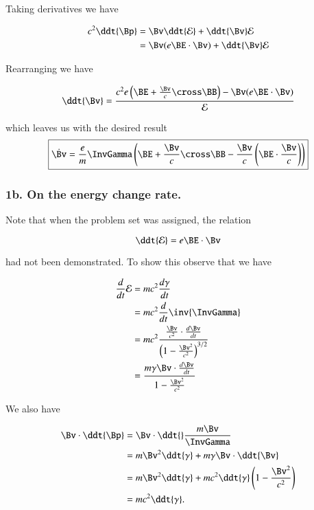 Taking derivatives we have

\begin{align*}
c^2 \ddt{\Bp} 
&= \Bv \ddt{\mathcal{E}} + \ddt{\Bv} \mathcal{E} \\
&= \Bv (e \BE \cdot \Bv) + \ddt{\Bv} \mathcal{E} \\
\end{align*}

Rearranging we have

\begin{equation}\label{eqn:relElectroDynProblemSet2:190}
\ddt{\Bv}
=
\frac{c^2 e \left( \BE + \frac{\Bv}{c} \cross \BB \right) - \Bv (e \BE \cdot \Bv) }{ \mathcal{E} } 
\end{equation}

which leaves us with the desired result
\begin{equation}\label{eqn:relElectroDynProblemSet2:210}
\boxed{
\dot{\Bv} =
\frac{e}{m} \InvGamma \left( \BE + \frac{\Bv}{c} \cross \BB - \frac{\Bv}{c} \left(\BE \cdot \frac{\Bv}{c} \right) \right)
}
\end{equation}

\subsubsection{1b.  On the energy change rate.}

Note that when the problem set was assigned, the relation

\begin{equation}\label{eqn:relElectroDynProblemSet2:230}
\ddt{\mathcal{E}} = e \BE \cdot \Bv
\end{equation}

had not been demonstrated.  To show this observe that we have

\begin{align*}
\frac{d}{dt} \mathcal{E}
&= m c^2 \frac{d\gamma}{dt} \\
&= m c^2 \frac{d}{dt} \inv{\InvGamma} \\
&= m c^2 \frac{\frac{\Bv}{c^2} \cdot \frac{d\Bv}{dt}}{\left(1 - \frac{\Bv^2}{c^2}\right)^{3/2}} \\
&= \frac{m \gamma \Bv \cdot \frac{d\Bv}{dt}}{1 - \frac{\Bv^2}{c^2}}
\end{align*}

We also have

\begin{align*}
\Bv \cdot \ddt{\Bp} 
&= \Bv \cdot \ddt{} \frac{m \Bv}{\InvGamma} \\
&= m\Bv^2 \ddt{\gamma} + m \gamma \Bv \cdot \ddt{\Bv} \\
&= m\Bv^2 \ddt{\gamma} + m c^2 \ddt{\gamma} \left( 1 - \frac{\Bv^2}{c^2} \right) \\
&= m c^2 \ddt{\gamma}.
\end{align*}

